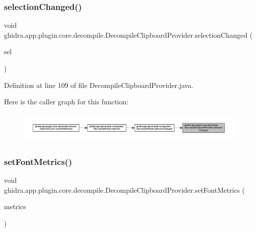 \subsubsection{\texorpdfstring{selectionChanged()}{selectionChanged()}}
{\footnotesize\ttfamily void ghidra.\+app.\+plugin.\+core.\+decompile.\+Decompile\+Clipboard\+Provider.\+selection\+Changed (\begin{DoxyParamCaption}\item[{Field\+Selection}]{sel }\end{DoxyParamCaption})\hspace{0.3cm}{\ttfamily [inline]}}



Definition at line 109 of file Decompile\+Clipboard\+Provider.\+java.

Here is the caller graph for this function\+:
\nopagebreak
\begin{figure}[H]
\begin{center}
\leavevmode
\includegraphics[width=350pt]{classghidra_1_1app_1_1plugin_1_1core_1_1decompile_1_1_decompile_clipboard_provider_a34748b26487a204609f3cecfdeb79b5f_icgraph}
\end{center}
\end{figure}
\mbox{\label{classghidra_1_1app_1_1plugin_1_1core_1_1decompile_1_1_decompile_clipboard_provider_ac1a518e259500fa971bbb361ae6d5ef1}} 
\subsubsection{\texorpdfstring{setFontMetrics()}{setFontMetrics()}}
{\footnotesize\ttfamily void ghidra.\+app.\+plugin.\+core.\+decompile.\+Decompile\+Clipboard\+Provider.\+set\+Font\+Metrics (\begin{DoxyParamCaption}\item[{Font\+Metrics}]{metrics }\end{DoxyParamCaption})\hspace{0.3cm}{\ttfamily [inline]}}



